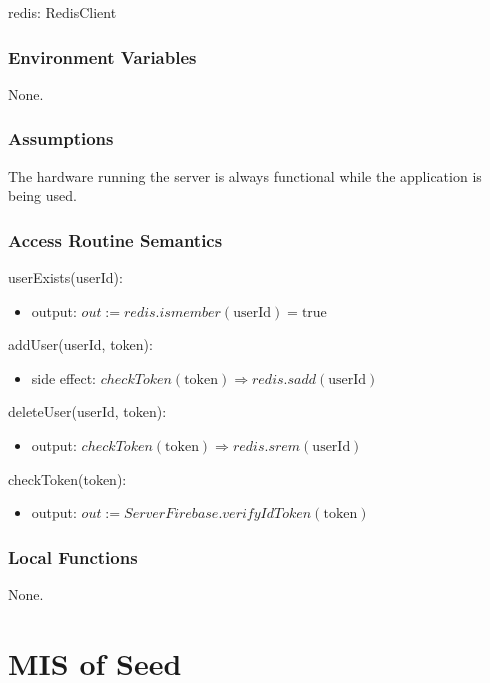 \documentclass[12pt, titlepage]{article}
\begin{document}
redis: RedisClient

\subsubsection{Environment Variables}

None.

\subsubsection{Assumptions}

The hardware running the server is always functional while the application is being used.

\subsubsection{Access Routine Semantics}

\noindent userExists(userId):
\begin{itemize}
\item output: $out := redis.ismember(\text{userId}) = \text{true}$
\end{itemize}

\noindent addUser(userId, token):
\begin{itemize}
\item side effect: $checkToken(\text{token}) \Rightarrow redis.sadd(\text{userId})$
\end{itemize}

\noindent deleteUser(userId, token):
\begin{itemize}
\item output: $checkToken(\text{token}) \Rightarrow redis.srem(\text{userId})$
\end{itemize}

\noindent checkToken(token):
\begin{itemize}
\item output: $out := ServerFirebase.verifyIdToken(\text{token})$
\end{itemize}

\subsubsection{Local Functions}

None.
  
\medskip
\newpage

\section{MIS of Seed} \label{Seed} 
\end{document}
